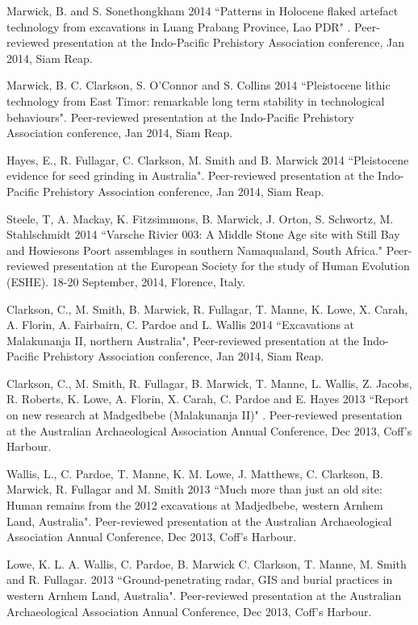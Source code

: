 \ind Marwick, B.  and S. Sonethongkham 2014 ``Patterns in Holocene flaked artefact technology from excavations in Luang Prabang Province, Lao PDR" . Peer-reviewed presentation at the Indo-Pacific Prehistory Association conference, Jan 2014, Siam Reap.

\ind Marwick, B. C. Clarkson, S. O’Connor and S. Collins 2014 ``Pleistocene lithic technology from East Timor: remarkable long term stability in technological behaviours". Peer-reviewed presentation at the Indo-Pacific Prehistory Association conference, Jan 2014, Siam Reap.

\ind Hayes, E., R. Fullagar, C. Clarkson, M. Smith and B. Marwick 2014 ``Pleistocene evidence for seed grinding in Australia". Peer-reviewed presentation at the Indo-Pacific Prehistory Association conference, Jan 2014, Siam Reap.

\ind Steele, T, A. Mackay, K. Fitzsimmons, B. Marwick, J. Orton, S. Schwortz, M. Stahlschmidt 2014 ``Varsche Rivier 003: A Middle Stone Age site with Still Bay and Howiesons Poort assemblages in southern Namaqualand, South Africa." Peer-reviewed presentation at the European Society for the study of Human Evolution (ESHE). 18-20 September, 2014, Florence, Italy.

\ind Clarkson, C., M. Smith, B. Marwick, R. Fullagar, T. Manne, K. Lowe, X. Carah,  A. Florin, A.  Fairbairn, C. Pardoe and L. Wallis 2014 ``Excavations at Malakunanja II, northern Australia",  Peer-reviewed presentation at the Indo-Pacific Prehistory Association conference, Jan 2014, Siam Reap.

\ind Clarkson, C., M. Smith, R. Fullagar, B. Marwick, T. Manne, L. Wallis, Z. Jacobs, R. Roberts, K. Lowe, A. Florin, X. Carah, C. Pardoe and E. Hayes 2013 ``Report on new research at Madgedbebe (Malakunanja II)" . Peer-reviewed presentation at the Australian Archaeological Association Annual Conference, Dec 2013, Coff’s Harbour.

\ind Wallis, L., C. Pardoe, T. Manne, K. M. Lowe, J. Matthews, C.   Clarkson, B. Marwick, R. Fullagar and M. Smith 2013 ``Much more than just an old site: Human remains from the 2012 excavations at Madjedbebe, western Arnhem Land, Australia". Peer-reviewed presentation at the Australian Archaeological Association Annual Conference, Dec 2013, Coff’s Harbour.

\ind Lowe, K. L. A. Wallis, C. Pardoe, B. Marwick C. Clarkson, T. Manne, M. Smith and R. Fullagar. 2013 ``Ground-penetrating radar, GIS and burial practices in western Arnhem Land, Australia". Peer-reviewed presentation at the Australian Archaeological Association Annual Conference, Dec 2013, Coff’s Harbour.

